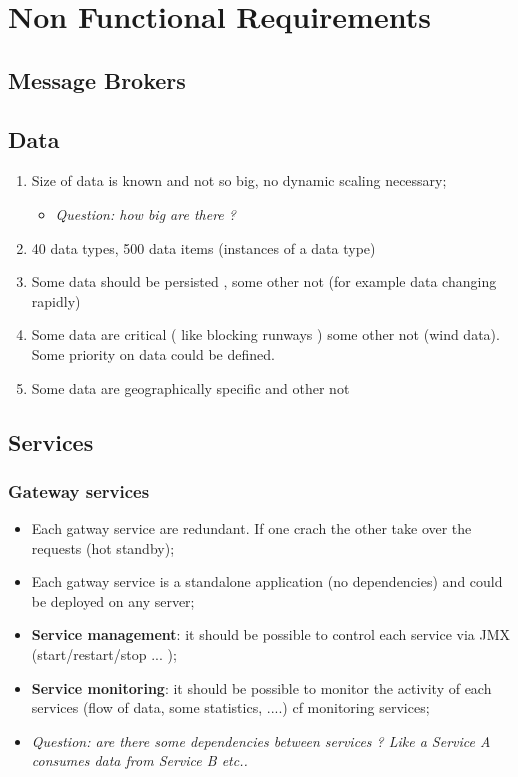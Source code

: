 \documentclass[a4paper,20pt,notitlepage]{article}
\begin{document}
\section{Non Functional Requirements}

\subsection{Message Brokers}

\subsection{Data}
\begin{enumerate}
 \item Size of data is known and not so big, no dynamic scaling necessary;
 \begin{itemize}
  \item \textit{Question: how big are there ?}
 \end{itemize}
 \item 40 data types, 500 data items (instances of a data type)
 \item Some data should be persisted , some other not (for example data changing rapidly)
 \item Some data are critical ( like blocking runways ) some other not (wind data). Some priority on data could be defined. 
 \item Some data are geographically specific and other not
\end{enumerate}

\subsection{Services}
\subsubsection{Gateway services}
 \begin{itemize}
  \item Each gatway service are redundant. If one crach the other take over the requests (hot standby);
\item Each gatway service is a standalone application (no dependencies) and could be deployed on any server;
\item \textbf{Service management}: it should be possible to control each service via JMX (start/restart/stop ... );
\item \textbf{Service monitoring}: it should be possible to monitor the activity of each services (flow of data, some statistics, ....) cf monitoring services;
\item \textit{Question: are there some dependencies between services ? Like a Service A consumes data from Service B etc..}
 \end{itemize}
\end{document}
